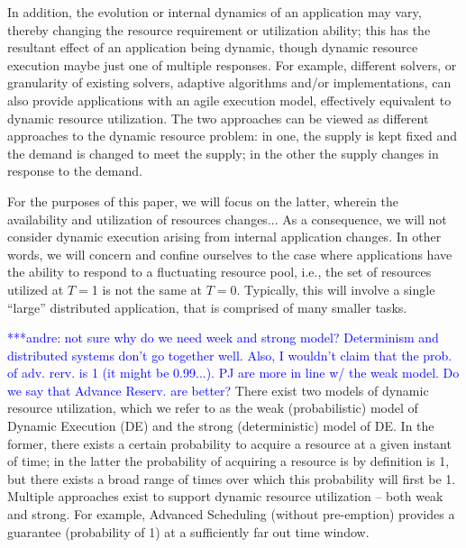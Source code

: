 \documentclass[conference,final]{IEEEtran}
\newcommand{\jhanote}[1]{ {\textcolor{red} { ***shantenu: #1 }}}
\newcommand{\alnote}[1]{ {\textcolor{blue} { ***andre: #1 }}}
\newcommand{\alnote}[1]{}
\newcommand{\jhanote}[1]{}
\begin{document}

In addition, the evolution or internal dynamics of an application may
vary, thereby changing the resource requirement or utilization
ability; this has the resultant effect of an application being
dynamic, though dynamic resource execution maybe just one of multiple
responses.  For example, different solvers, or granularity of existing
solvers, adaptive algorithms and/or implementations, can also provide
applications with an agile execution model, effectively equivalent to
dynamic resource utilization. The two approaches can be viewed as
different approaches to the dynamic resource problem: in one, the
supply is kept fixed and the demand is changed to meet the supply; in
the other the supply changes in response to the demand.

For the purposes of this paper, we will focus on the latter, wherein
the availability and utilization of resources changes...  As a
consequence, we will not consider dynamic execution arising from
internal application changes.  In other words, we will concern
and confine ourselves to  %
the case where applications have the ability to respond to a
fluctuating resource pool, i.e., the set of resources utilized at
$T=$1 is not the same at $T=$0.  Typically, this will involve a
single ``large'' distributed application, that is comprised of many
smaller tasks.



\alnote{not sure why do we need week and strong model? Determinism and 
distributed systems don't go together well. Also, I wouldn't claim that
the prob. of adv. rerv. is 1 (it might be 0.99...). PJ are more in line
w/ the weak model. Do we say that Advance Reserv. are better?}
There exist two models of dynamic resource utilization, which we refer
to as the weak (probabilistic) model of Dynamic Execution (DE) and the
strong (deterministic) model of DE. In the former, there exists a
certain probability to acquire a resource at a given instant of time;
in the latter the probability of acquiring a resource is by definition
is 1, but there exists a broad range of times over which this
probability will first be 1.  Multiple approaches exist to support
dynamic resource utilization -- both weak and strong.  For example,
Advanced Scheduling (without pre-emption) provides a guarantee
(probability of 1) at a sufficiently far out time window.
\end{document}
